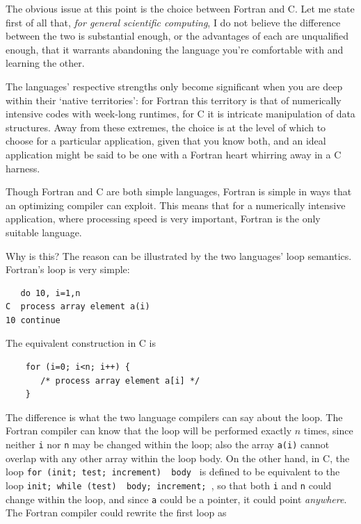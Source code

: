 \documentclass[11pt,oneside,chapters]{starlink}
\begin{document}
The obvious issue at this point is the choice between
Fortran and C.  Let me state first of all that, \emph{for
general scientific computing}, I do not believe the
difference between the two is substantial enough, or the
advantages of each are unqualified enough, that it warrants
abandoning the language you're comfortable with and learning
the other.

The languages' respective strengths only become significant
when you are deep within their `native territories': for
Fortran this territory is that of numerically intensive
codes with week-long runtimes, for C it is intricate
manipulation of data structures.  Away from these extremes,
the choice is at the level of which to choose for a
particular application, given that you know both, and an
ideal application might be said to be one with a Fortran
heart whirring away in a C harness.

Though Fortran and C are both simple languages, Fortran is
simple in ways that an optimizing compiler can exploit.
This means that for a numerically intensive application,
where processing speed is very important, Fortran is the
only suitable language.

Why is this?  The reason can be illustrated by the two
languages' loop semantics.  Fortran's loop is very simple:

\begin{verbatim}
   do 10, i=1,n
C  process array element a(i)
10 continue
\end{verbatim}

The equivalent construction in C is

\begin{verbatim}
    for (i=0; i<n; i++) {
       /* process array element a[i] */
    }
\end{verbatim}

The difference is what the two language compilers can say about the
loop. The Fortran compiler can know that the loop
will be performed exactly $n$
times, since neither \texttt{i} nor \texttt{n} may be changed within the loop; also the array \texttt{a(i)}
cannot overlap with any other array within the loop body.  On the
other hand, in C, the loop
\texttt{for (init; test; increment) { body }} is defined to be
equivalent to
the loop \texttt{init; while (test) {
body; increment; }}, so that both \texttt{i} and
\texttt{n} could change within the loop, and since \texttt{a}
could be a
pointer, it could point \emph{anywhere}.  The Fortran
compiler could
rewrite the first loop as
\end{document}
